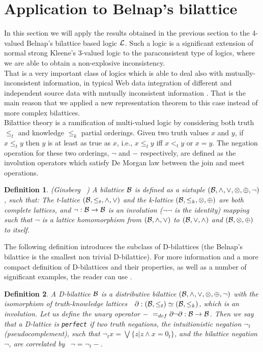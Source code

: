 \documentclass[10pt,twocolumn]{article}
\newtheorem{definition}{Definition}
\begin{document}
\section{Application to Belnap's bilattice}
In this section we will apply the results obtained in the previous section to the 4-valued Belnap's bilattice
 based logic $\mathcal{L}$. Such a logic is a significant extension of normal strong Kleene's
 3-valued logic to the paraconsistent type of logics, where we are
 able to obtain a non-explosive inconsistency.\\ That is a very important
 class of logics which is able to deal also with
 mutually-inconsistent information, in typical Web data integration
 of different and independent source data with mutually inconsistent
 information \cite{MajkA04}. That is the main reason that we applied a new representation theorem to this case instead
 of more complex bilattices.\\
 Bilattice theory is a ramification of multi-valued logic by
considering both truth $\leq_t$ and knowledge $\leq_k$  partial
orderings. Given two truth values $x$ and $y$, if $x \leq_t y$ then
$y$ is at least as true as $x$, i.e., $x \leq_t y$ iff $x <_t y$ or
$x = y$. The negation operation for these two orderings, $\neg$ and
$-$ respectively, are defined as the involution operators which
satisfy De Morgan law between the join and meet operations.
\begin{definition} (Ginsberg ~\cite{Gins88})  \label{def:billat} A bilattice $\mathcal{B}$ is
defined as a sixtuple $(\mathcal{B}, \wedge, \vee,  \otimes, \oplus, \neg)$,
such that:  The t-lattice $(\mathcal{B}, \leq_t, \wedge, \vee)$ and the
k-lattice $(\mathcal{B}, \leq_k,\otimes, \oplus)$ are both complete lattices,
and  $\neg:\mathcal{B} \rightarrow \mathcal{B}$ is an involution ($\neg \neg$ is the
identity) mapping such that $\neg$ is a lattice homomorphism from
$(\mathcal{B}, \wedge, \vee)$ to $(\mathcal{B}, \vee, \wedge)$ and $(\mathcal{B},\otimes,
\oplus)$ to itself.
\end{definition}
 The following definition introduces the subclass of D-bilattices \cite{Majk06Bi}
 (the Belnap's bilattice is the smallest non trivial D-bilattice). For
 more information and a more compact definition of D-bilattices and their properties,
 as well as a number of significant examples, the reader can use \cite{Majk07MV}.
\begin{definition}  \cite{Majk07MV} \label{def:d-billat}
A D-bilattice $\mathcal{B}$ is a  distributive bilattice $(\mathcal{B}, \wedge, \vee,
\otimes, \oplus,  \neg)$ with the isomorphism of truth-knowledge
lattices $~~\partial:(\mathcal{B},\leq_t) \simeq (\mathcal{B}, \leq_k)$, which is an
involution. Let us define the unary operator $-~ =_{def}
\partial \neg \partial:\mathcal{B} \rightarrow \mathcal{B}$. Then we say
that a D-lattice  is \verb"perfect" if two truth negations, the
intuitionistic negation $\neg_t$ (pseudocomplement), such that
$\neg_t x = \bigvee \{z| z\wedge x = 0_t\}$, and the bilattice
negation $\neg$, are correlated by $~~\neg = \neg_t -$.
\end{definition}
\end{document}

